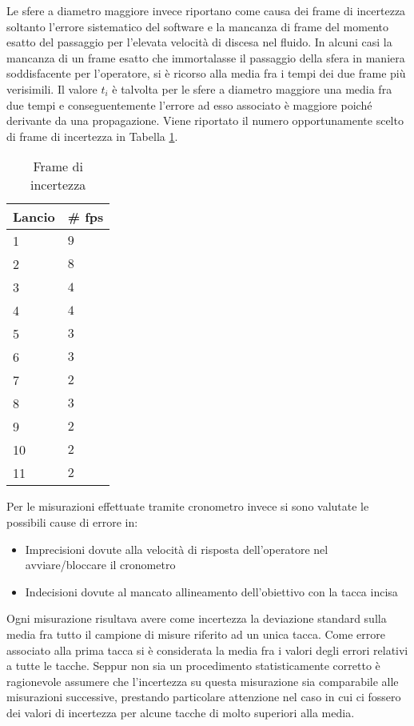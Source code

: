 \documentclass[a4paper,11pt,oneside]{article}
\begin{document}
Le sfere a diametro maggiore invece riportano come causa dei frame di incertezza soltanto l'errore sistematico del software e la mancanza di frame del momento esatto del passaggio per l'elevata velocità di discesa nel fluido.
In alcuni casi la mancanza di un frame esatto che immortalasse il passaggio della sfera in maniera soddisfacente per l'operatore, si è ricorso alla media fra i tempi dei due frame più verisimili. Il valore $t_i$ è talvolta per le sfere a diametro maggiore una media fra due tempi e conseguentemente l'errore ad esso associato è maggiore poiché derivante da una propagazione.
Viene riportato il numero opportunamente scelto di frame di incertezza in Tabella \ref{tab:frame_incertezza}.

\begin{table}[]
\caption{Frame di incertezza}
\label{tab:frame_incertezza}
\begin{tabular}{ll}
Lancio & \# fps  \\ \hline
1      & $9$ \\ \hline
2      & $8$ \\ \hline
3      & $4$ \\ \hline
4      & $4$ \\ \hline
5      & $3$ \\ \hline
6      & $3$ \\ \hline
7      & $2$ \\ \hline
8      & $3$ \\ \hline
9      & $2$ \\ \hline
10     & $2$ \\ \hline
11     & $2$
\end{tabular}
\end{table}


Per le misurazioni effettuate tramite cronometro invece si sono valutate le possibili cause di errore in:
\begin{itemize}
    \item Imprecisioni dovute alla velocità di risposta dell'operatore nel avviare/bloccare il cronometro
    \item Indecisioni dovute al mancato allineamento dell'obiettivo con la tacca incisa
\end{itemize}
Ogni misurazione risultava avere come incertezza la deviazione standard sulla media fra tutto il campione di misure riferito ad un unica tacca. Come errore associato alla prima tacca si è considerata la media fra i valori degli errori relativi a tutte le tacche.
Seppur non sia un procedimento statisticamente corretto è ragionevole assumere che l'incertezza su questa misurazione sia comparabile alle misurazioni successive, prestando particolare attenzione nel caso in cui ci fossero dei valori di incertezza per alcune tacche di molto superiori alla media. 
\end{document}
